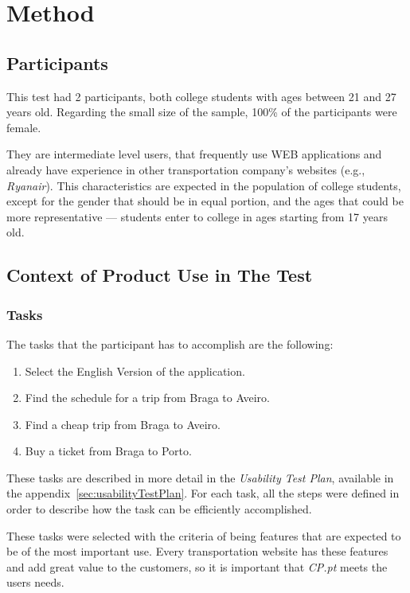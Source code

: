 \documentclass[a4paper]{article}
\begin{document}
\section{Method}

\subsection{Participants}

This test had 2 participants, both college students with ages between 21 and 27 years old. Regarding the small size of the sample, 100\% of the participants were female.

They are intermediate level users, that frequently use WEB applications and already have experience in other transportation company's websites (e.g., \emph{Ryanair}). This characteristics are expected in the population of college students, except for the gender that should be in equal portion, and the ages that could be more representative --- students enter to college in ages starting from 17 years old.

\subsection{Context of Product Use in The Test}
\subsubsection{Tasks}
\label{sec:tasks}
The tasks that the participant has to accomplish are the following:

\begin{enumerate}
  \item Select the English Version of the application.
  \item Find the schedule for a trip from Braga to Aveiro.
  \item Find a cheap trip from Braga to Aveiro.
  \item Buy a ticket from Braga to Porto.
\end{enumerate}

These tasks are described in more detail in the \emph{Usability Test Plan}, available in the appendix~\ref{sec:usabilityTestPlan}. For each task, all the steps were defined in order to describe how the task can be efficiently accomplished.

These tasks were selected with the criteria of being features that are expected to be of the most important use. Every transportation website has these features and add great value to the customers, so it is important that \emph{CP.pt} meets the users needs.
\end{document}
